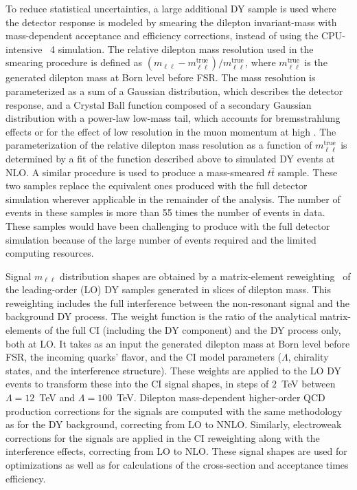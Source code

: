 To reduce statistical uncertainties, a large additional DY sample is used where the detector response is modeled by smearing the dilepton invariant-mass with mass-dependent acceptance and efficiency corrections, instead of using the CPU-intensive \GEANT~4 simulation.
The relative dilepton mass resolution used in the smearing procedure is defined as $(m_{\ell\ell}-m_{\ell\ell}^\mathrm{true})/m_{\ell\ell}^\mathrm{true}$, where $m_{\ell\ell}^\mathrm{true}$ is the generated dilepton mass at Born level before FSR.
The mass resolution is parameterized as a sum of a Gaussian distribution, which describes the detector response, and a Crystal Ball function composed of a secondary Gaussian distribution with a power-law low-mass tail,
which accounts for bremsstrahlung effects or for the effect of low resolution in the muon momentum at high \pt.
The parameterization of the relative dilepton mass resolution as a function of $m_{\ell\ell}^\mathrm{true}$ is determined by a fit of the function described above to simulated DY events at NLO.
A similar procedure is used to produce a mass-smeared $t\bar{t}$ sample.
These two samples replace the equivalent ones produced with the full detector simulation wherever applicable in the remainder of the analysis.
The number of events in these samples is more than 55 times the number of events in data.
These samples would have been challenging to produce with the full detector simulation because of the large number of events required and the limited computing resources.

Signal $m_{\ell\ell}$ distribution shapes are obtained by a matrix-element reweighting~\cite{EXOT-2016-05} of the leading-order (LO) DY samples generated in slices of dilepton mass.
This reweighting includes the full interference between the non-resonant signal and the background DY process.
The weight function is the ratio of the analytical matrix-elements of the full CI (including the DY component) and the DY process only, both at LO.
It takes as an input the generated dilepton mass at Born level before FSR, the incoming quarks' flavor, and the CI model parameters ($\Lambda$, chirality states, and the interference structure).
These weights are applied to the LO DY events to transform these into the CI signal shapes, in steps of $2$~TeV between $\Lambda=12$~TeV and $\Lambda=100$~TeV.
Dilepton mass-dependent higher-order QCD production corrections for the signals are computed with the same methodology as for the DY background, correcting from LO to NNLO.
Similarly, electroweak corrections for the signals are applied in the CI reweighting along with the interference effects, correcting from LO to NLO.
These signal shapes are used for optimizations as well as for calculations of the cross-section and acceptance times efficiency.

